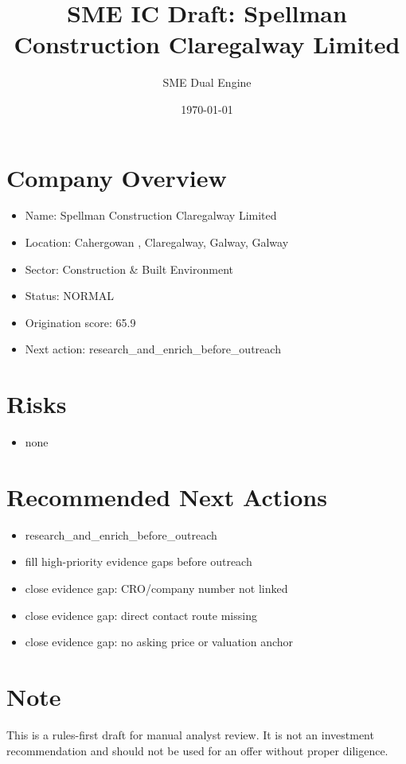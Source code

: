 \documentclass[11pt,a4paper]{article}
\title{SME IC Draft: Spellman Construction Claregalway Limited}
\author{SME Dual Engine}
\date{\today}
\begin{document}
\maketitle
\section*{Company Overview}
\begin{itemize}[leftmargin=1.4em]
\item Name: Spellman Construction Claregalway Limited
\item Location: Cahergowan , Claregalway, Galway, Galway
\item Sector: Construction \& Built Environment
\item Status: NORMAL
\item Origination score: 65.9
\item Next action: research\_and\_enrich\_before\_outreach
\end{itemize}
\section*{Risks}
\begin{itemize}[leftmargin=1.4em]
\item none
\end{itemize}
\section*{Recommended Next Actions}
\begin{itemize}[leftmargin=1.4em]
\item research\_and\_enrich\_before\_outreach
\item fill high-priority evidence gaps before outreach
\item close evidence gap: CRO/company number not linked
\item close evidence gap: direct contact route missing
\item close evidence gap: no asking price or valuation anchor
\end{itemize}
\section*{Note}
This is a rules-first draft for manual analyst review. It is not an investment
recommendation and should not be used for an offer without proper diligence.
\end{document}
